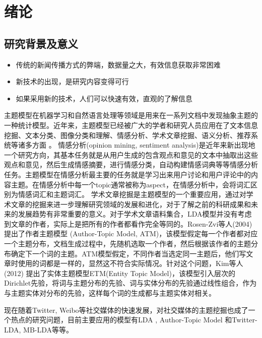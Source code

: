 \chapter{绪论}

\section{研究背景及意义}

\begin{itemize}
\item 传统的新闻传播方式的弊端，数据量之大，有效信息获取非常困难
\item 新技术的出现，是研究内容变得可行
\item 如果采用新的技术，人们可以快速有效，直观的了解信息
\end{itemize}

主题模型在机器学习和自然语言处理等领域是用来在一系列文档中发现抽象主题的一种统计模型。近年来，主题模型已经被广大的学者和研究人员应用在了文本信息挖掘、文本分类、图像分类和理解、情感分析、学术文章挖掘、语义分析、推荐系统等诸多方面 \cite{leskovec2009meme, wang2012tm, 008:labeledlda, 2011:xuge, 011:mblda}。
情感分析(opinion mining,  sentiment analysis)是近年来新出现地一个研究方向，其基本任务就是从用户生成的包含观点和意见的文本中抽取出这些观点和意见，然后生成情感摘要，进行情感分类，自动构建情感词典等等情感分析任务。主题模型在情感分析最主要的任务就是学习出来用户讨论和用户评论中的内容主题。在情感分析中每一个topic通常被称为aspect，在情感分析中，会将词汇区别为情感词汇和主题词汇。
学术文章挖掘是主题模型的一个重要应用，通过对学术文章的挖掘来进一步理解研究领域的发展和进化，对于了解之前的科研成果和未来的发展趋势有非常重要的意义。对于学术文章语料集合，LDA模型并没有考虑到文章的作者，实际上是把所有的作者都看作完全等同的。Rosen-Zvi等人(2004) \cite{rosen2004author} 提出了作者主题模型 (Author-Topic Model, ATM)，该模型假定每一个作者都对应一个主题分布，文档生成过程中，先随机选取一个作者，然后根据该作者的主题分布确定下一个词的主题。ATM模型假定，不同作者当选定同一主题后，他们写文章时使用的词都是一样的，显然这不符合实际情况。针对这个问题，Kim等人(2012) \cite{Kim:2012} 提出了实体主题模型ETM(Entity Topic Model)，该模型引入层次的Dirichlet先验，将词与主题分布的先验、词与实体分布的先验通过线性组合，作为与主题实体对分布的先验，这样每个词的生成都与主题实体对相关。


现在随着Twitter, Weibo等社交媒体的快速发展，对社交媒体的主题挖掘也成了一个热点的研究问题，目前主要应用的模型有LDA \cite{Blei:2003}, Author-Topic Model\cite{rosen2004author} 和Twitter-LDA\cite{zhao2011comparing}, MB-LDA\cite{011:mblda}等等。

